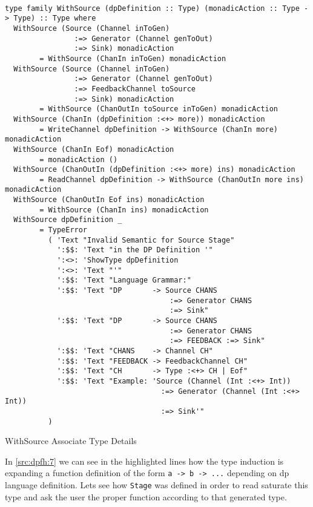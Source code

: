 \begin{listing}[H]
  \begin{verbatim}

type family WithSource (dpDefinition :: Type) (monadicAction :: Type -> Type) :: Type where
  WithSource (Source (Channel inToGen) 
                :=> Generator (Channel genToOut) 
                :=> Sink) monadicAction
        = WithSource (ChanIn inToGen) monadicAction
  WithSource (Source (Channel inToGen) 
                :=> Generator (Channel genToOut) 
                :=> FeedbackChannel toSource 
                :=> Sink) monadicAction
        = WithSource (ChanOutIn toSource inToGen) monadicAction
  WithSource (ChanIn (dpDefinition :<+> more)) monadicAction         
        = WriteChannel dpDefinition -> WithSource (ChanIn more) monadicAction
  WithSource (ChanIn Eof) monadicAction                              
        = monadicAction ()
  WithSource (ChanOutIn (dpDefinition :<+> more) ins) monadicAction  
        = ReadChannel dpDefinition -> WithSource (ChanOutIn more ins) monadicAction
  WithSource (ChanOutIn Eof ins) monadicAction                       
        = WithSource (ChanIn ins) monadicAction
  WithSource dpDefinition _                                          
        = TypeError
          ( 'Text "Invalid Semantic for Source Stage"
            ':$$: 'Text "in the DP Definition '"
            ':<>: 'ShowType dpDefinition
            ':<>: 'Text "'"
            ':$$: 'Text "Language Grammar:"
            ':$$: 'Text "DP       -> Source CHANS 
                                      :=> Generator CHANS 
                                      :=> Sink"
            ':$$: 'Text "DP       -> Source CHANS 
                                      :=> Generator CHANS 
                                      :=> FEEDBACK :=> Sink"
            ':$$: 'Text "CHANS    -> Channel CH"
            ':$$: 'Text "FEEDBACK -> FeedbackChannel CH"
            ':$$: 'Text "CH       -> Type :<+> CH | Eof"
            ':$$: 'Text "Example: 'Source (Channel (Int :<+> Int)) 
                                    :=> Generator (Channel (Int :<+> Int)) 
                                    :=> Sink'"
          )
  \end{verbatim}
  \caption{WithSource Associate Type Details}
  \label{src:dpfh:7}
\end{listing}

In \autoref{src:dpfh:7} we can see in the highlighted lines how the type induction is 
expanding a function definition of the form \texttt{a -> b -> ...} depending on 
\acrshort{dp} language definition. Lets see how \texttt{Stage} was defined in order 
to read saturate this type and ask the user the proper function according to that generated type.

